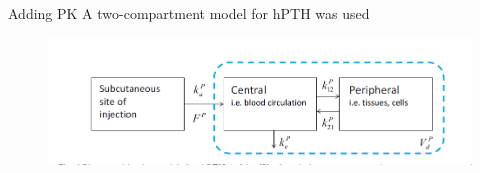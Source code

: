 \documentclass{beamer}
\begin{document}
\begin{frame}{Adding PK}
	A two-compartment model for hPTH was used
	\begin{figure}[h]
	\centering
		\includegraphics[scale=0.45]{../Figures/fig_lemaire_fig6.png}
\end{figure}		
	
\end{frame}
\end{document}
